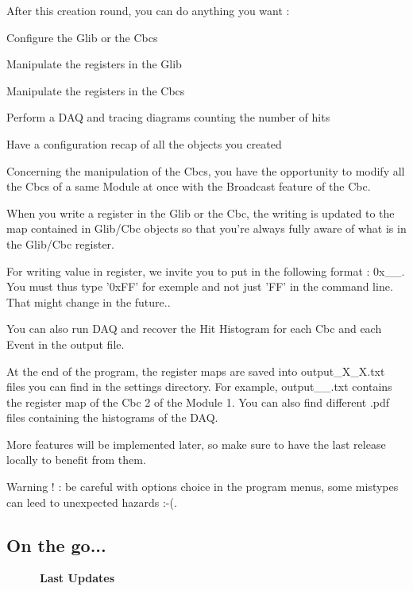 After this creation round, you can do anything you want \-:
\begin{DoxyItemize}
\item Configure the Glib or the Cbcs
\item Manipulate the registers in the Glib
\item Manipulate the registers in the Cbcs
\item Perform a D\-A\-Q and tracing diagrams counting the number of hits
\item Have a configuration recap of all the objects you created
\end{DoxyItemize}

Concerning the manipulation of the Cbcs, you have the opportunity to modify all the Cbcs of a same Module at once with the Broadcast feature of the Cbc.

When you write a register in the Glib or the Cbc, the writing is updated to the map contained in Glib/\-Cbc objects so that you're always fully aware of what is in the Glib/\-Cbc register.

For writing value in register, we invite you to put in the following format \-: 0x\-\_\-\-\_\-. You must thus type '0x\-F\-F' for exemple and not just 'F\-F' in the command line. That might change in the future..

You can also run D\-A\-Q and recover the Hit Histogram for each Cbc and each Event in the output file.

At the end of the program, the register maps are saved into output\-\_\-\-X\-\_\-\-X.\-txt files you can find in the settings directory. For example, output\-\_\-\_.\-txt contains the register map of the Cbc 2 of the Module 1. You can also find different .pdf files containing the histograms of the D\-A\-Q.

More features will be implemented later, so make sure to have the last release locally to benefit from them.

Warning ! \-: be careful with options choice in the program menus, some mistypes can leed to unexpected hazards \-:-\/(.

\subsection*{On the go... }

~~~~~~{\bfseries Last Updates}


